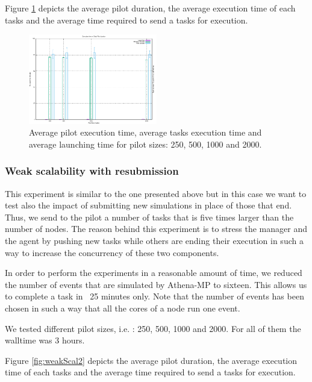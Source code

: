 Figure \ref{fig:weakScal1} depicts the average pilot duration, the average execution time of each tasks and the average time required to send a tasks for execution.  


\begin{figure}[!htb]
        \includegraphics[width=0.5\textwidth]{./figures/NGE/Weak.pdf}
    \caption{Average pilot execution time, average tasks execution time and average launching time for pilot sizes: 250, 500, 1000 and 2000.}
\label{fig:weakScal1}
\end{figure}
\subsubsection{Weak scalability with resubmission }
This experiment is similar to the one presented above but in this case we want to test also the impact of submitting new simulations in place of those that end. Thus, we send to the pilot a number of tasks that is five times larger than the number of nodes. The reason behind this experiment is to stress the manager and the agent by pushing new tasks while others are ending their execution in such a way to increase the concurrency of these two components.

In order to perform the experiments in a reasonable amount of time, we reduced  the number of events that are simulated by Athena-MP to sixteen. This allows us to complete a task in ~25 minutes only. Note that the number of events has been chosen in such a way that all the cores of a node run one event.

We tested different pilot sizes, i.e. : 250, 500, 1000 and 2000. For all of them the walltime was 3 hours. 

Figure \ref{fig:weakScal2}   depicts the average pilot duration, the average execution time of each tasks and the average time required to send a tasks for execution.  

